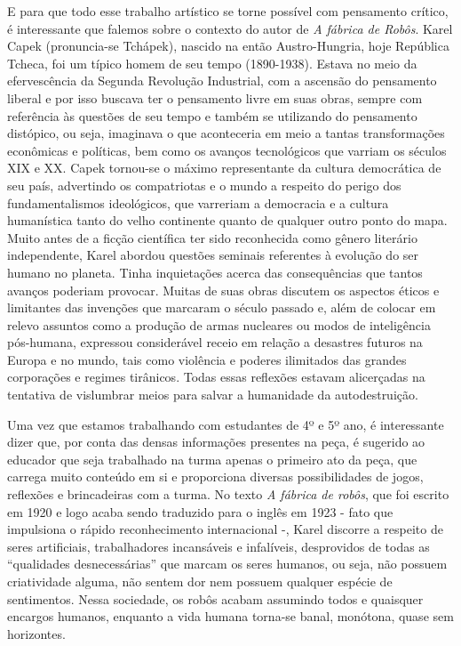\documentclass[11pt]{extarticle}
\begin{document}
E para que todo esse trabalho artístico se torne possível com pensamento crítico, é interessante que falemos sobre o contexto do autor de \textit{A fábrica de Robôs}. Karel Capek (pronuncia-se Tchápek), nascido na então Austro-Hungria, hoje República Tcheca, foi um típico homem de seu tempo (1890-1938). Estava no meio da efervescência da Segunda Revolução Industrial, com a ascensão do pensamento liberal e por isso buscava ter o pensamento livre em suas obras, sempre com referência às questões de seu tempo e também se utilizando do pensamento distópico, ou seja, imaginava o que aconteceria em meio a tantas transformações econômicas e políticas, bem como os avanços tecnológicos que varriam os séculos XIX e XX. Capek tornou-se o máximo representante da cultura democrática de seu país, advertindo os compatriotas e o mundo a respeito do perigo dos fundamentalismos ideológicos, que varreriam a democracia e a cultura humanística tanto do velho continente quanto de qualquer outro ponto do mapa. Muito antes de a ficção científica ter sido reconhecida como gênero literário independente, Karel abordou questões seminais referentes à evolução do ser humano no planeta. Tinha inquietações acerca das consequências que tantos avanços poderiam provocar. Muitas de suas obras discutem os aspectos éticos e limitantes das invenções que marcaram o século passado e, além de colocar em relevo assuntos como a produção de armas nucleares ou modos de inteligência pós-humana, expressou considerável receio em relação a desastres futuros na Europa e no mundo, tais como violência e poderes ilimitados das grandes corporações e regimes tirânicos. Todas essas reflexões estavam alicerçadas na tentativa de vislumbrar meios para salvar a humanidade da autodestruição. 


Uma vez que estamos trabalhando com estudantes de 4º e 5º ano, é interessante dizer que, por conta das densas informações presentes na peça, é sugerido ao educador que seja trabalhado na turma apenas o primeiro ato da peça, que carrega muito conteúdo em si e proporciona diversas possibilidades de jogos, reflexões e brincadeiras com a turma. No texto \textit{A fábrica de robôs}, que foi escrito em 1920 e logo acaba sendo traduzido para o inglês em 1923 - fato que impulsiona o rápido reconhecimento internacional  -, Karel discorre a respeito de seres artificiais, trabalhadores incansáveis e infalíveis, desprovidos de todas as “qualidades desnecessárias” que marcam os seres humanos, ou seja, não possuem criatividade alguma, não sentem dor nem possuem qualquer espécie de sentimentos. Nessa sociedade, os robôs acabam assumindo todos e quaisquer encargos humanos, enquanto a vida humana torna-se banal, monótona, quase sem horizontes.
\end{document}

